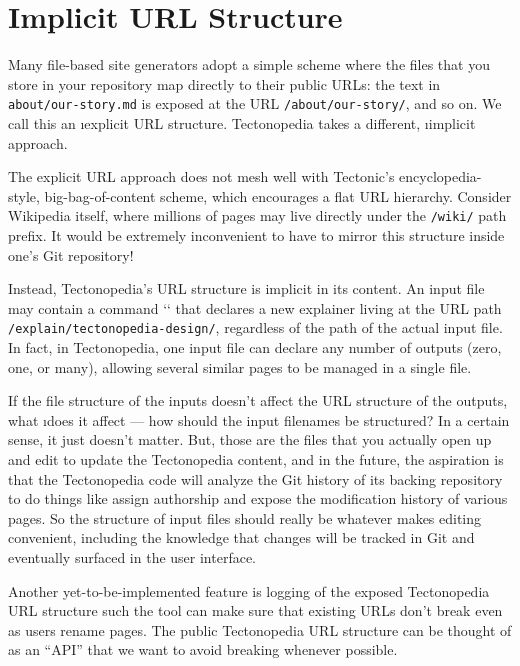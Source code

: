 \section*{Implicit URL Structure}

Many file-based site generators adopt a simple scheme where the files that you
store in your repository map directly to their public URLs: the text in
\texttt{about/our-story.md} is exposed at the URL \texttt{/about/our-story/},
and so on. We call this an \i{explicit} URL structure. Tectonopedia takes a
different, \i{implicit} approach.

The explicit URL approach does not mesh well with Tectonic's encyclopedia-style,
big-bag-of-content scheme, which encourages a flat URL hierarchy. Consider
Wikipedia itself, where millions of pages may live directly under the
\texttt{/wiki/} path prefix. It would be extremely inconvenient to have to
mirror this structure inside one's Git repository!

Instead, Tectonopedia's URL structure is implicit in its content. An input file
may contain a command \tex`` that declares a new
explainer living at the URL path \texttt{/explain/tectonopedia-design/},
regardless of the path of the actual input file. In fact, in Tectonopedia, one
input file can declare any number of outputs (zero, one, or many), allowing
several similar pages to be managed in a single file.

If the file structure of the inputs doesn't affect the URL structure of the
outputs, what \i{does} it affect — how should the input filenames be structured?
In a certain sense, it just doesn't matter. But, those are the files that you
actually open up and edit to update the Tectonopedia content, and in the future,
the aspiration is that the Tectonopedia code will analyze the Git history of its
backing repository to do things like assign authorship and expose the
modification history of various pages. So the structure of input files should
really be whatever makes editing convenient, including the knowledge that
changes will be tracked in Git and eventually surfaced in the user interface.

Another yet-to-be-implemented feature is logging of the exposed Tectonopedia URL
structure such the tool can make sure that existing URLs don't break even as
users rename pages. The public Tectonopedia URL structure can be thought of as
an “API” that we want to avoid breaking whenever possible.
